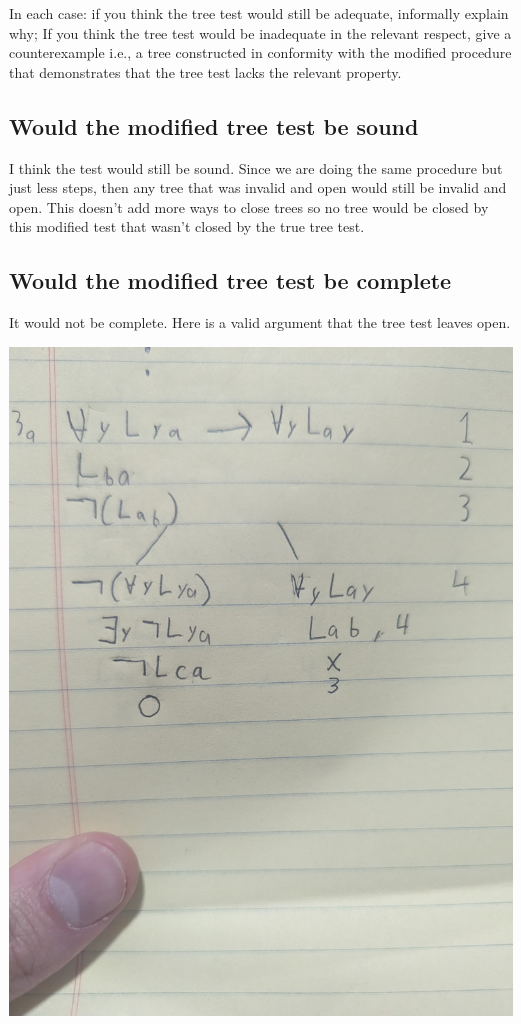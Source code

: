\documentclass[12pt]{article}
\begin{document}
In each case: if you think the tree test would still be adequate, informally explain why;  If you think the tree test would  be inadequate in the relevant respect, give a counterexample i.e., a tree constructed in conformity with the modified procedure that demonstrates that the tree test lacks the relevant property.


\subsection*{Would the modified tree test be sound}

I think the test would still be sound. Since we are doing the same procedure but just less steps, then any tree that was invalid and open would still be invalid and open. This doesn't add more ways to close trees so no tree would be closed by this modified test that wasn't closed by the true tree test.  

\subsection*{Would the modified tree test be complete}

It would not be complete. Here is a valid argument that the tree test leaves open. 

\includegraphics[width=\textwidth]{6b}
\end{document}
